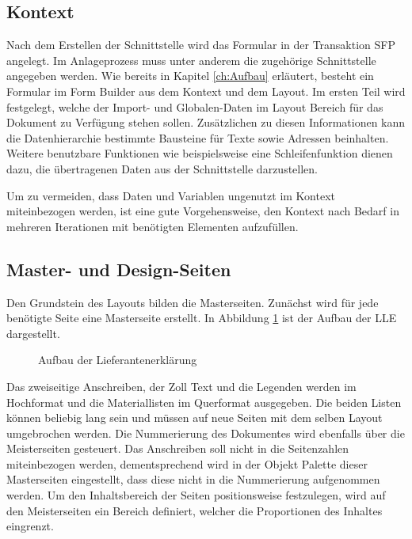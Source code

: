 \subsection{Kontext}

Nach dem Erstellen der Schnittstelle wird das Formular in der Transaktion SFP angelegt. Im Anlageprozess muss unter anderem die zugehörige Schnittstelle angegeben werden. Wie bereits in Kapitel \ref{ch:Aufbau} erläutert, besteht ein Formular im Form Builder aus dem Kontext und dem Layout. Im ersten Teil wird festgelegt, welche der Import- und Globalen-Daten im Layout Bereich für das Dokument zu Verfügung stehen sollen. Zusätzlichen zu diesen Informationen kann die Datenhierarchie bestimmte Bausteine für Texte sowie Adressen beinhalten. Weitere benutzbare Funktionen wie beispielsweise eine Schleifenfunktion dienen dazu, die übertragenen Daten aus der Schnittstelle darzustellen.

Um zu vermeiden, dass Daten und Variablen ungenutzt im Kontext miteinbezogen werden, ist eine gute Vorgehensweise, den Kontext nach Bedarf in mehreren Iterationen mit benötigten Elementen aufzufüllen.


\FloatBarrier
\subsection{Master- und Design-Seiten}
\label{ch:tab}

Den Grundstein des Layouts bilden die Masterseiten. Zunächst wird für jede benötigte Seite eine Masterseite erstellt. In Abbildung \ref{figLLE} ist der Aufbau der \ac{LLE} dargestellt.

\begin{figure}[ht]
	\centering
	\caption{Aufbau der Lieferantenerklärung}
	\label{figLLE}
	
\end{figure}

Das zweiseitige Anschreiben, der Zoll Text und die Legenden werden im Hochformat und die Materiallisten im Querformat ausgegeben. Die beiden Listen können beliebig lang sein und müssen auf neue Seiten mit dem selben Layout umgebrochen werden.
Die Nummerierung des Dokumentes wird ebenfalls über die Meisterseiten gesteuert. Das Anschreiben soll nicht in die Seitenzahlen miteinbezogen werden, dementsprechend wird in der Objekt Palette dieser Masterseiten eingestellt, dass diese nicht in die Nummerierung aufgenommen werden. Um den Inhaltsbereich der Seiten positionsweise festzulegen, wird auf den Meisterseiten ein Bereich definiert, welcher die Proportionen des Inhaltes eingrenzt. 
  
